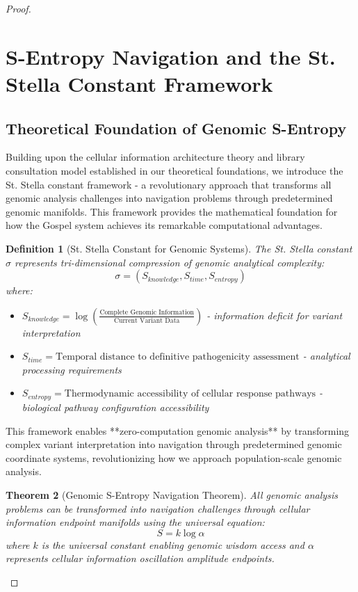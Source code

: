 \documentclass[12pt,a4paper]{article}
\newtheorem{theorem}{Theorem}[section]
\newtheorem{definition}[theorem]{Definition}
\begin{document}
\begin{proof}
\section{S-Entropy Navigation and the St. Stella Constant Framework}

\subsection{Theoretical Foundation of Genomic S-Entropy}

Building upon the cellular information architecture theory and library consultation model established in our theoretical foundations, we introduce the St. Stella constant framework - a revolutionary approach that transforms all genomic analysis challenges into navigation problems through predetermined genomic manifolds. This framework provides the mathematical foundation for how the Gospel system achieves its remarkable computational advantages.

\begin{definition}[St. Stella Constant for Genomic Systems]
The St. Stella constant $\sigma$ represents tri-dimensional compression of genomic analytical complexity:
$$\sigma = (S_{knowledge}, S_{time}, S_{entropy})$$
where:
\begin{itemize}
\item $S_{knowledge} = \log\left(\frac{\text{Complete Genomic Information}}{\text{Current Variant Data}}\right)$ - information deficit for variant interpretation
\item $S_{time} = \text{Temporal distance to definitive pathogenicity assessment}$ - analytical processing requirements  
\item $S_{entropy} = \text{Thermodynamic accessibility of cellular response pathways}$ - biological pathway configuration accessibility
\end{itemize}
\end{definition}

This framework enables **zero-computation genomic analysis** by transforming complex variant interpretation into navigation through predetermined genomic coordinate systems, revolutionizing how we approach population-scale genomic analysis.

\begin{theorem}[Genomic S-Entropy Navigation Theorem]
All genomic analysis problems can be transformed into navigation challenges through cellular information endpoint manifolds using the universal equation:
$$S = k \log \alpha$$
where $k$ is the universal constant enabling genomic wisdom access and $\alpha$ represents cellular information oscillation amplitude endpoints.
\end{theorem}


\end{proof}
\end{document}
